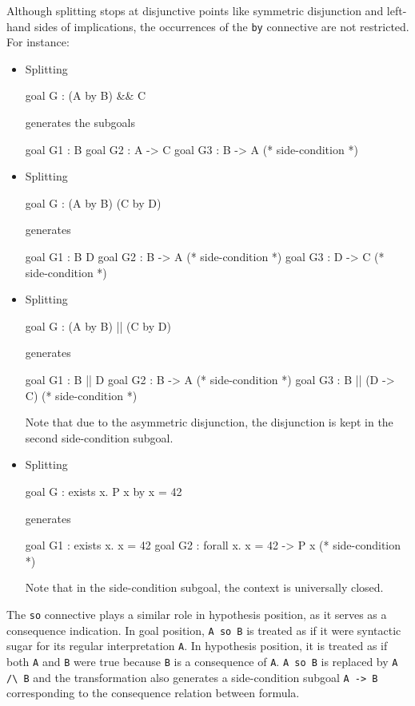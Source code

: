 \begin{description}
  Although splitting stops at disjunctive points like symmetric
  disjunction and left-hand sides of implications, the occurrences of
  the \texttt{by} connective are not restricted. For instance:
  \begin{itemize}
  \item Splitting
\begin{whycode}
goal G : (A by B) && C
\end{whycode}
generates the subgoals
\begin{whycode}
goal G1 : B
goal G2 : A -> C
goal G3 : B -> A (* side-condition *)
\end{whycode}
\item Splitting
\begin{whycode}
goal G : (A by B) \/ (C by D)
\end{whycode}
generates
\begin{whycode}
goal G1 : B \/ D
goal G2 : B -> A (* side-condition *)
goal G3 : D -> C (* side-condition *)
\end{whycode}
\item Splitting
\begin{whycode}
goal G : (A by B) || (C by D)
\end{whycode}
generates
\begin{whycode}
goal G1 : B || D
goal G2 : B -> A        (* side-condition *)
goal G3 : B || (D -> C) (* side-condition *)
\end{whycode}
Note that due to the asymmetric disjunction, the disjunction is kept in the
second side-condition subgoal.
\item Splitting
\begin{whycode}
goal G : exists x. P x by x = 42
\end{whycode}
generates
\begin{whycode}
goal G1 : exists x. x = 42
goal G2 : forall x. x = 42 -> P x (* side-condition *)
\end{whycode}
Note that in the side-condition subgoal, the context is universally closed.
\end{itemize}

The \texttt{so} connective plays a similar role in hypothesis position, as it serves as a consequence indication. In goal position, \verb|A so B| is treated as if it were syntactic sugar for its regular interpretation \verb|A|. In hypothesis position, it is treated as if both \verb|A| and \verb|B| were true because \verb|B| is a consequence of \verb|A|. \verb|A so B| is replaced by \verb|A /\ B| and the transformation also generates a side-condition subgoal \verb|A -> B| corresponding to the consequence relation between formula.


\end{description}
